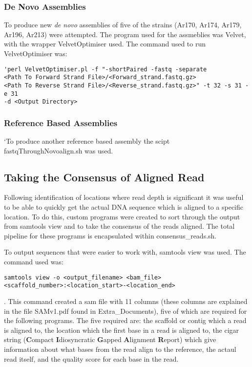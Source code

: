 \documentclass[../main.tex]{subfiles}
\begin{document}
	\subsubsection{De Novo Assemblies}
	To produce new \textit{de novo} assemblies of five of the strains (Ar170, Ar174, Ar179, Ar196, Ar213) were attempted. The program used for the assmeblies was Velvet, with the wrapper VelvetOptimiser used. The command used to run VelvetOptimiser was: 
\begin{verbatim}
'perl VelvetOptimiser.pl -f "-shortPaired -fastq -separate 
<Path To Forward Strand File>/<Forward_strand.fastq.gz> 
<Path To Reverse Strand File>/<Reverse_strand.fastq.gz>" -t 32 -s 31 -e 31 
-d <Output Directory>
\end{verbatim}

	\subsubsection{Reference Based Assemblies}
	`To produce another reference based assembly the scipt fastqThroughNovoalign.sh was used.

\subsection{Taking the Consensus of Aligned Read}
	Following identification of locations where read depth is significant it was useful to be able to quickly get the actual DNA sequence which is aligned to a specific location. To do this, custom programs were created to sort through the output from samtools view and to take the consensus of the reads aligned. The total pipeline for these programs is encapsulated within consensus\_reads.sh.
	
	To output sequences that were easier to work with, samtools view was used. The command used was: \begin{verbatim}samtools view -o <output_filename> <bam_file> 
<scaffold_number>:<location_start>-<location_end>\end{verbatim} . This command created a sam file with 11 columns (these columns are explained in the file SAMv1.pdf found in Extra_Documents), five of which are required for the following programs. The five required are: the scaffold or contig which a read is aligned to, the location which the first base in a read is aligned to, the cigar string (\textbf{C}ompact \textbf{I}diosyncratic \textbf{G}apped \textbf{A}lignment \textbf{R}eport) which give information about what bases from the read align to the reference, the actaul read itself, and the quality score for each base in the read. 
\end{document}
